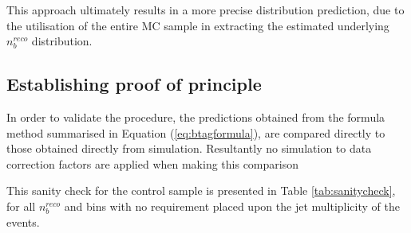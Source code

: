 This approach ultimately results in a more precise \nbreco distribution prediction, due to the utilisation of the entire MC sample in extracting the estimated underlying $n_{b}^{reco}$ distribution.

\subsection{Establishing proof of principle}
\label{subsec:formulamethodsanity}

In order to validate the procedure, the predictions obtained from the formula method summarised in Equation (\ref{eq:btagformula}), are compared directly to those obtained directly from simulation. Resultantly no simulation to data correction factors are applied when making this comparison

This sanity check for the \mupjets control sample is presented in Table \ref{tab:sanitycheck}, for all $n_{b}^{reco}$ and \theht bins with no requirement placed upon the jet multiplicity of the events.  


